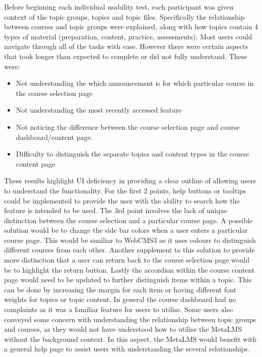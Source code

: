 Before beginning each individual usability test, each participant was given context of the topic groups, topics and topic files. Specifically the relationship between courses and topic groups were explained, along with how topics contain 4 types of material (preparation, content, practice, assessments).
Most users could navigate through all of the tasks with ease. However there were certain aspects that took longer than expected to complete or did not fully understand.
These were:
\begin{itemize}
    \item Not understanding the which announcement is for which particular course in the course selection page
    \item Not understanding the most recently accessed feature
    \item Not noticing the difference between the course selection page and course dashboard/content page.
    \item Difficulty to distinguish the separate topics and content types in the course content page
\end{itemize}

These results highlight UI deficiency in providing a clear outline of allowing users to understand the functionality.
For the first 2 points, help buttons or tooltips could be implemented to provide the user with the ability to search how the feature is intended to be used.
The 3rd point involves the lack of unique distinction between the course selection and a particular course page. A possible solution would be to change the side bar colors when a user enters a particular course page.
This would be similiar to WebCMS3 as it uses colours to distinguish different courses from each other.
Another supplement to this solution to provide more distinction that a user can return back to the course selection page would be to highlight the return button.
Lastly the accordion within the course content page would need to be updated to further distinguish items within a topic. This can be done by increasing the margin for each item or having different font weights for topics or topic content.
In general the course dashboard had no complaints as it was a familiar feature for users to utilise.
Some users also conveyed some concern with understanding the relationship between topic groups and courses, as they would not have understood how to utilise the MetaLMS without the background context.
In this aspect, the MetaLMS would benefit with a general help page to assist users with understanding the several relationships.

